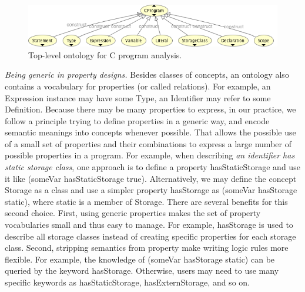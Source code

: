 \begin{figure}[h]
	\centering
	\includegraphics[width=\columnwidth]{graph/c_onto}	
	\caption{Top-level ontology for C program analysis.
		}
	\label{fig:c_onto}
\end{figure}

{\em Being generic in property designs.}  Besides classes of concepts,
an ontology also contains a vocabulary for properties (or called
relations).  For example, an \textsf{Expression} instance may have
some \textsf{Type}, an \textsf{Identifier} may refer to some
\textsf{Definition}. Because there may be many properties to express,
in our practice, we follow a principle trying to define properties in
a generic way, and encode semantic meanings into concepts whenever
possible.  That allows the possible use of a small set of properties
and their combinations to express a large number of possible
properties in a program. For example, when describing \emph{an
  identifier has static storage class}, one approach is to define a
property \textsf{hasStaticStorage} and use it like \textsf{(someVar
  hasStaticStorage true)}.  Alternatively, we may define the concept
\textsf{Storage} as a class and use a simpler property
\textsf{hasStorage} as \textsf{(someVar hasStorage static)}, where
\textsf{static} is a member of \textsf{Storage}.  There are several
benefits for this second choice. First, using generic properties makes
the set of property vocabularies small and thus easy to manage.  For
example, \textsf{hasStorage} is used to describe all storage classes
instead of creating specific properties for each storage class.
Second, stripping semantics from property make writing logic rules
more flexible.  For example, the knowledge of \textsf{(someVar
  hasStorage static)} can be queried by the keyword
\textsf{hasStorage}.  Otherwise, users may need to use many specific
keywords as \textsf{hasStaticStorage}, \textsf{hasExternStorage}, and
so on.


